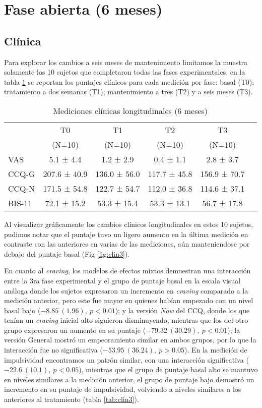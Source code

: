 \section{Fase abierta (6 meses)}
\subsection{Clínica}

Para explorar los cambios a seis meses de mantenimiento limitamos la muestra solamente los 10 sujetos que completaron todas las fases experimentales, en la tabla \ref{tab:cl3} se reportan los puntajes clínicos para cada medición por fase: basal (T0); tratamiento a dos semanas (T1); mantenimiento a tres (T2) y a seis meses (T3).

\begin{table}[!hbp]
    \centering
    \small
    \caption{Mediciones clínicas longitudinales (6 meses)}
    \label{tab:cl3}
\begin{tabular}{lccccc}
\hline
 & T0 & T1 & T2 & T3 \\
 & (N=10) & (N=10) & (N=10) & (N=10)\\
\hline
VAS   &  5.1 ±  4.4 &  1.2 ±  2.9 &  0.4 ±  1.1 &  2.8 ±  3.7 \\
CCQ-G  & 207.6 ± 40.9 & 136.0 ± 56.0 & 117.7 ± 45.8 & 156.9 ± 70.7 \\
CCQ-N  & 171.5 ± 54.8 & 122.7 ± 54.7 & 112.0 ± 36.8 & 114.6 ± 37.1 \\
BIS-11 & 72.1 ± 15.2 & 53.3 ± 15.4 & 53.3 ± 13.1 & 56.7 ± 17.8 \\
\hline
\end{tabular}
\end{table}

Al visualizar gráficamente los cambios clínicos longitudinales en estos 10 sujetos, pudimos notar que el puntaje tuvo un ligero aumento en la última medición en contraste con las anteriores en varias de las mediciones, aún manteniendose por debajo del puntaje basal (Fig \ref{fig:clin3}). \par
En cuanto al \textit{craving}, los modelos de efectos mixtos demuestran una interacción entre la 3ra fase experimental y el grupo de puntaje basal en la escala visual análoga donde los sujetos expresaron un incremento en \textit{craving} comparado a la medición anterior, pero este fue mayor en quienes habían empezado con un nivel basal bajo ($-8.85\ (1.96),\ p<0.01$); y la versión \textit{Now} del CCQ, donde los que tenían un \textit{craving} inicial alto siguieron disminuyendo, mientras que los del otro grupo expresaron un aumento en su puntaje ($-79.32\ (30.29),\ p<0.01$); la versión General mostró un empeoramiento similar en ambos grupos, por lo que la interacción fue no significativa ($-53.95\ (36.24),\ p>0.05$). En la medición de impulsividad encontramos un patrón similar, con una interacción significativa ($-22.6\ (10.1),\ p<0.05$), mientras que el grupo de puntaje basal alto se mantuvo en niveles similares a la medición anterior, el grupo de puntaje bajo demostró un incremento en su puntaje de impulsividad, volviendo a niveles similares a los anteriores al tratamiento (tabla \ref{tab:clin3}).

